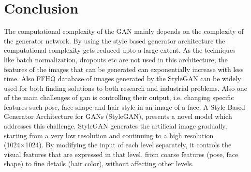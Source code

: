 \chapter{Conclusion}
\label{chapter:conclusion}
\begin{Conclusion}

The computational complexity of the GAN mainly depends on the complexity of the generator network. By using the style based generator architecture the computational complexity gets reduced upto a large extent. As the techniques like batch normalization, dropouts etc are not used in this architecture, the features of the images that can be generated can exponentially increase with less time. Also FFHQ database of images generated by the StyleGAN can be widely used for both finding solutions to both research and industrial problems. 
Also one of the main challenges of gan  is controlling their output, i.e. changing specific features such pose, face shape and hair style in an image of a face.   A Style-Based Generator Architecture for GANs (StyleGAN), presents a novel model which addresses this challenge. StyleGAN generates the artificial image gradually, starting from a very low resolution and continuing to a high resolution (1024×1024). By modifying the input of each level separately, it controls the visual features that are expressed in that level, from coarse features (pose, face shape) to fine details (hair color), without affecting other levels.
\end{Conclusion}